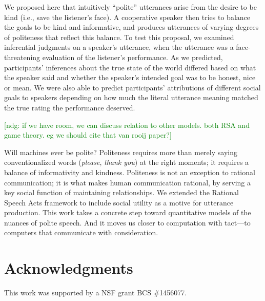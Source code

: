 \documentclass[10pt,letterpaper]{article}
\newcommand{\ndg}[1]{\textcolor{Green}{[ndg: #1]}}
\begin{document}
We proposed here that intuitively ``polite'' utterances arise from the desire to be kind (i.e., save the listener's face). 
A cooperative speaker then tries to balance the goals to be kind and informative, and produces utterances of varying degrees of politeness that reflect this balance.
To test this proposal, we examined inferential judgments on a speaker's utterance, when the utterance was a face-threatening evaluation of the listener's performance.
As we predicted, participants' inferences about the true state of the world differed based on what the speaker said and whether the speaker's intended goal was to be honest, nice or mean.
We were also able to predict participants' attributions of different social goals to speakers depending on
how much the literal utterance meaning matched the true rating the performance deserved.


\ndg{if we have room, we can discuss relation to other models. both RSA and game theory. eg we should cite that van rooij paper?}

Will machines ever be polite?
Politeness requires more than merely saying conventionalized words (\emph{please}, \emph{thank you}) at the right moments; it requires a balance of informativity and kindness.
Politeness is not an exception to rational communication; it is what makes human communication rational, by serving a key social function of maintaining relationships.
We extended the Rational Speech Acts framework to include social utility as a motive for utterance production.
This work takes a concrete step toward quantitative models of the nuances of polite speech.
And it moves us closer to computation with tact---to computers that communicate with consideration.

\section{Acknowledgments}

This work was supported by a NSF grant BCS \#1456077. 


\setlength{\bibleftmargin}{.125in}
\setlength{\bibindent}{-\bibleftmargin}


\end{document}
